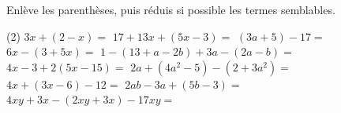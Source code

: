 %
%
Enlève les parenthèses, puis réduis si possible les termes semblables.
  \begin{tasks}(2)
    \task $3x+\left(2-x\right)=$
    \task $17+13x+\left(5x-3\right)=$
    \task $\left(3a+5\right) -17=$
    \task $6x-\left(3+5x\right)=$
    \task $1-\left(13+a-2b\right) + 3a - \left(2a-b\right)=$
    \task $4x-3+2\left(5x-15\right)=$
    \task $2a+\left(4a^2-5\right) - \left(2+3a^2\right)=$
    \task $4x+\left(3x-6\right) -12=$
    \task $2ab-3a+\left(5b-3\right)=$
    \task $4xy+3x-\left(2xy+3x\right) -17xy=$
  \end{tasks}
